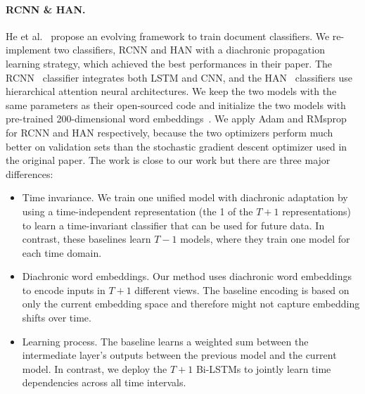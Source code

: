 \paragraph{RCNN \& HAN.} 
He et al.~\cite{he2018time} propose an evolving framework to train document classifiers. We re-implement two classifiers, RCNN and HAN with a diachronic propagation learning strategy, which achieved the best performances in their paper. The RCNN~\cite{lai2015recurrent} classifier integrates both LSTM and CNN, and the HAN~\cite{yang2016hierarchical} classifiers use hierarchical attention neural architectures. We keep the two models with the same parameters as their open-sourced code and initialize the two models with pre-trained 200-dimensional word embeddings~\cite{bojanowski2017enriching}. We apply Adam and RMsprop for RCNN and HAN respectively, because the two optimizers perform much better on validation sets than the stochastic gradient descent optimizer used in the original paper. The work is close to our work but there are three major differences:
\begin{itemize}
    \item Time invariance. We train one unified model with diachronic adaptation by using a time-independent representation (the 1 of the $T+1$ representations) to learn a time-invariant classifier that can be used for future data. In contrast, these baselines learn $T-1$ models, where they train one model for each time domain.
    \item Diachronic word embeddings. Our method uses diachronic word embeddings to encode inputs in $T+1$ different views. The baseline encoding is based on only the current embedding space and therefore might not capture embedding shifts over time.
    \item Learning process. The baseline learns a weighted sum between the intermediate layer's outputs between the previous model and the current model. In contrast, we deploy the $T+1$ Bi-LSTMs to jointly learn time dependencies across all time intervals.
\end{itemize} 


